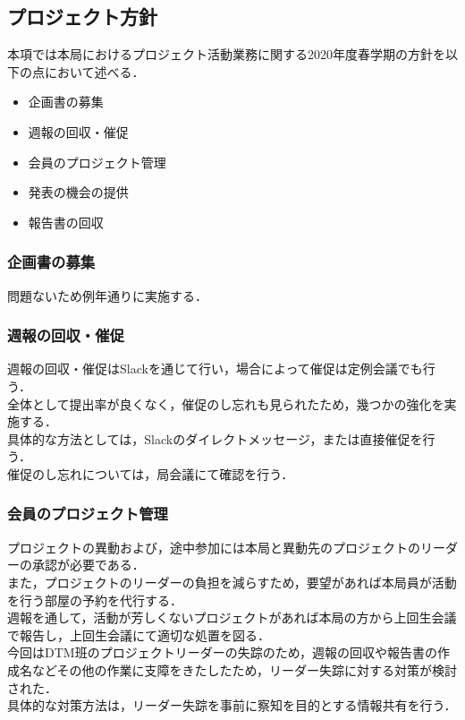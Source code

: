 ﻿\subsection*{プロジェクト方針}


本項では本局におけるプロジェクト活動業務に関する2020年度春学期の方針を以下の点において述べる．

\begin{itemize}
\item 企画書の募集
\item 週報の回収・催促
\item 会員のプロジェクト管理
\item 発表の機会の提供
\item 報告書の回収
\end{itemize}

\subsubsection*{企画書の募集}
問題ないため例年通りに実施する．\\

\subsubsection*{週報の回収・催促}

週報の回収・催促はSlackを通じて行い，場合によって催促は定例会議でも行う．\\
全体として提出率が良くなく，催促のし忘れも見られたため，幾つかの強化を実施する．\\
具体的な方法としては，Slackのダイレクトメッセージ，または直接催促を行う．\\催促のし忘れについては，局会議にて確認を行う．\\

\subsubsection*{会員のプロジェクト管理}

プロジェクトの異動および，途中参加には本局と異動先のプロジェクトのリーダーの承認が必要である．\\
また，プロジェクトのリーダーの負担を減らすため，要望があれば本局員が活動を行う部屋の予約を代行する．\\
週報を通して，活動が芳しくないプロジェクトがあれば本局の方から上回生会議で報告し，上回生会議にて適切な処置を図る．\\
今回はDTM班のプロジェクトリーダーの失踪のため，週報の回収や報告書の作成名などその他の作業に支障をきたしたため，リーダー失踪に対する対策が検討された．\\
具体的な対策方法は，リーダー失踪を事前に察知を目的とする情報共有を行う．\\

